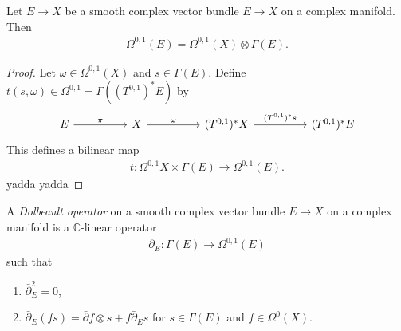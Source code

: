 \documentclass{article}
\begin{document}
\begin{lemma}
  Let $E\to X$ be a smooth complex vector bundle $E\to X$ on a complex
  manifold. Then
  \begin{align*}
    \Omega^{0,1}(E) = \Omega^{0,1}(X)\otimes\Gamma(E).
  \end{align*}
  \begin{proof}
    Let $\omega\in\Omega^{0,1}(X)$ and $s\in\Gamma(E)$. Define
    $t(s,\omega)\in\Omega^{0,1}=\Gamma({\left({T^{0,1}}\right)^* E})$
    by
    \begin{equation*}
      \begin{tikzcd}
        E && X && {(T^{0,1})^* X} && {(T^{0,1})^*E}
        \arrow["\pi", from=1-1, to=1-3]
        \arrow["\omega", from=1-3, to=1-5]
        \arrow["{(T^{0,1})^* s}", from=1-5, to=1-7]
      \end{tikzcd}
    \end{equation*}
    This defines a bilinear map
    \begin{align*}
      t : \Omega^{0,1} X \times \Gamma(E) \to \Omega^{0,1}(E).
    \end{align*}
    yadda yadda
    \missingproof
  \end{proof}
\end{lemma}

\begin{definition}
  A \emph{Dolbeault operator} on a smooth complex vector bundle
  $E\to X$ on a complex manifold is a $\mathbb{C}$-linear operator
  \begin{align*}
    \bar\partial_E : \Gamma(E) \to \Omega^{0,1}(E)
  \end{align*}
  such that
  \begin{enumerate}
    \item $\bar\partial_E^2 = 0$,
    \item $\bar\partial_E(fs) = \bar\partial f \otimes s + f\bar\partial_E s$
      for $s\in\Gamma(E)$ and $f\in\Omega^0(X)$.
  \end{enumerate}
\end{definition}
\end{document}
